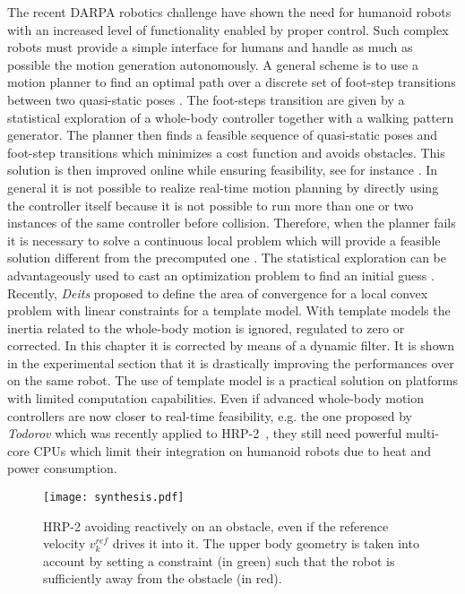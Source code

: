 The recent DARPA robotics challenge have shown the need for humanoid robots with an increased level of functionality
enabled by proper control.
Such complex robots must provide a simple interface for humans and handle as much as possible the motion generation autonomously.
A general scheme is to use a motion planner to find an optimal path over a discrete set of foot-step transitions between two quasi-static poses \cite{Chestnutt:2010:MPHR,Hornung:ICHR:12}.
The foot-steps transition are given by a statistical exploration of a whole-body controller together with a walking pattern generator.
The planner then finds a feasible sequence of quasi-static poses and foot-step transitions which minimizes a cost function and avoids obstacles.
This solution is then improved online while ensuring feasibility, see for instance \cite{perrin:itro:12}.
In general it is not possible to realize real-time motion planning by directly using the controller itself because it is not possible to run more than one or two instances of the same controller before collision.
Therefore, when the planner fails it is necessary to solve a continuous local problem which will provide a feasible solution different from the precomputed one \cite{Chestnutt:2010:MPHR}.
The statistical exploration can be advantageously used to cast an optimization problem to find an initial guess \cite{Chestnutt:2010:MPHR}.
Recently, \emph{Deits} proposed to define the area of convergence for a local convex problem with linear constraints \cite{deits:ichr:14}
for a template model.
With template models the inertia related to the whole-body motion is ignored, regulated to zero or corrected.
In this chapter it is corrected by means of a dynamic filter. It is shown in the experimental section that it is drastically improving the 
performances over \cite{herdt:iros:2010} on the same robot.
The use of template model is a practical solution on platforms with limited computation capabilities.
Even if advanced whole-body motion controllers are now closer to real-time feasibility, e.g. the one proposed by \emph{Todorov} which was recently applied to
HRP-2~\cite{Koenemann:iros:2015}, they still need powerful multi-core CPUs which limit their integration on humanoid robots due to heat and power consumption.
\begin{figure}[t]
  \centering
  \texttt{[image: synthesis.pdf]}
  \caption[Problem setup]{HRP-2 avoiding reactively on an obstacle, even if the reference velocity $v^{ref}_k$ drives it into it. The upper body geometry is taken into account by setting a constraint (in green) such that the robot is sufficiently away from the obstacle (in red).}
  \label{fig:covernmpcwalkgen}
\end{figure}

